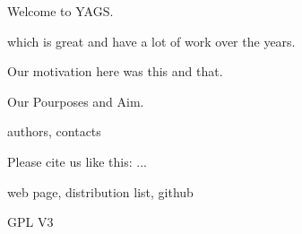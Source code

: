 

Welcome to YAGS.

which is great and have a lot of work over the years. 

Our motivation here was this and that.

Our Pourposes and Aim.

authors, contacts



 Please cite us like this: ... 



web page, distribution list, github



GPL V3 


